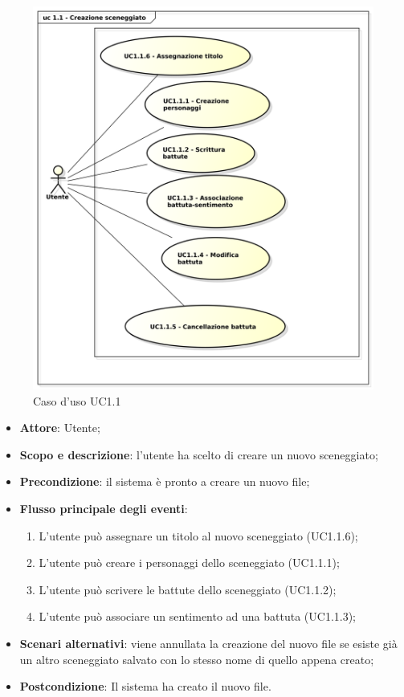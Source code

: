 \begin{figure}[htbp]
\centering
\includegraphics[scale=0.5]{UseCase_17_03_2016/immagini/uc_1_1_creazione_sceneggiato.png}
\captionsetup{labelfont=bf}
\caption{Caso d'uso UC1.1}
\end{figure}

\begin{itemize}
\item \textbf{Attore}: Utente;
\item \textbf{Scopo e descrizione}: l'utente ha scelto di creare un nuovo sceneggiato;
\item \textbf{Precondizione}: il sistema è pronto a creare un nuovo file;
\item \textbf{Flusso principale degli eventi}:
\begin{enumerate}
\item L'utente può assegnare un titolo al nuovo sceneggiato (UC1.1.6);
\item L'utente può creare i personaggi dello sceneggiato (UC1.1.1);
\item L'utente può scrivere le battute dello sceneggiato (UC1.1.2);
\item L'utente può associare un sentimento ad una battuta (UC1.1.3);
\end{enumerate}
\item \textbf{Scenari alternativi}: viene annullata la creazione del nuovo file se esiste già un altro sceneggiato salvato con lo stesso nome di quello appena creato; 
\item \textbf{Postcondizione}: Il sistema ha creato il nuovo file.
\end{itemize}

